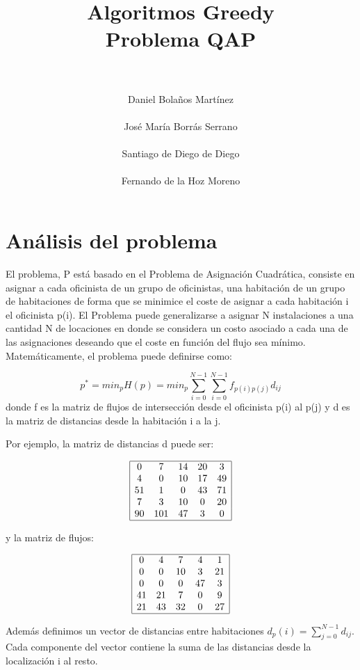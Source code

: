 \documentclass[11pt, a4paper]{article}
\title{
  \normalfont \normalsize 
  \textsc{} \\ [25pt]    %
  \horrule{0.5pt} \\[0.4cm] %
  \huge Algoritmos Greedy \\ \Large Problema QAP\\ %
  \horrule{2pt} \\[0.5cm] %
}
\author{\Large{Daniel Bolaños Martínez} 
\\\\
\Large{José María Borrás Serrano}
\\\\
\Large{Santiago de Diego de Diego}
\\\\
\Large{Fernando de la Hoz Moreno}}
\date{\vspace{-1.5em} \normalsize }
\theoremstyle{theorem-style}
\theoremstyle{definition-style}
\theoremstyle{remark-style}
\theoremstyle{example-style}
\begin{document}
\maketitle  %
\vfill
\begin{center}
\end{center}
\newpage
\newpage

\section{Análisis del problema}

El problema, P está basado en el Problema de Asignación Cuadrática,
consiste en asignar a cada oficinista de un grupo de oficinistas,
una habitación de un grupo de habitaciones de forma que se minimice
el coste de asignar a cada habitación i el oficinista p(i). El Problema
puede generalizarse a asignar N instalaciones a una cantidad N de
locaciones en donde se considera un costo asociado a cada una de las
asignaciones deseando que el coste en función del flujo sea mínimo.
Matemáticamente, el problema puede definirse como:

\[
p^{*}=min_{p}{H(p)}=min_{p}{\displaystyle \sum_{i=0}^{N-1}{\displaystyle \sum_{i=0}^{N-1}}f_{p(i)p(j)}d_{ij}}
\]
donde f es la matriz de flujos de intersección desde el oficinista
p(i) al p(j) y d es la matriz de distancias desde la habitación
i a la j.

Por ejemplo, la matriz de distancias d puede ser:

\[
\begin{array}{|ccccc|}
\hline 0 & 7 & 14 & 20 & 3\\
4 & 0 & 10 & 17 & 49\\
51 & 1 & 0 & 43 & 71\\
7 & 3 & 10 & 0 & 20\\
90 & 101 & 47 & 3 & 0
\\\hline \end{array}
\]

y la matriz de flujos:

\[
\begin{array}{|ccccc|}
\hline 0 & 4 & 7 & 4 & 1\\
0 & 0 & 10 & 3 & 21\\
0 & 0 & 0 & 47 & 3\\
41 & 21 & 7 & 0 & 9\\
21 & 43 & 32 & 0 & 27
\\\hline \end{array}
\]

Además definimos un vector de distancias entre habitaciones $d_p(i)=\displaystyle\sum_{j=0}^{N-1}d_{ij}$.
Cada componente del vector contiene la suma de las distancias desde
la localización i al resto.
\end{document}
